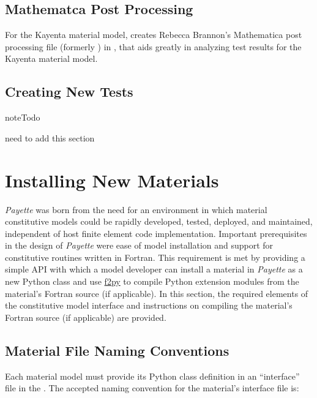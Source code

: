 \documentclass[letterpaper,10pt,english]{sphinxmanual}
\begin{document}
\section{Mathematca Post Processing}
\label{Files/test_payette:mathematca-post-processing}
For the Kayenta material model,  creates Rebecca Brannon's
Mathematica post processing file  (formerly )
in , that aids greatly in
analyzing test results for the Kayenta material model.


\section{Creating New Tests}
\label{Files/test_payette:creating-new-tests}
\begin{notice}{note}{Todo}

need to add this section
\end{notice}


\chapter{Installing New Materials}
\label{Files/installing_materials::doc}\label{Files/installing_materials:installing-new-materials}
\emph{Payette} was born from the need for an environment in which material
constitutive models could be rapidly developed, tested, deployed, and maintained,
independent of host finite element code implementation. Important prerequisites
in the design of \emph{Payette} were ease of model installation and support for
constitutive routines written in Fortran. This requirement is met by providing a
simple API with which a model developer can install a material in \emph{Payette} as
a new Python class and use \href{http://www.scipy.org/F2py}{f2py} to compile
Python extension modules from the material's Fortran source (if applicable). In
this section, the required elements of the constitutive model interface and
instructions on compiling the material's Fortran source (if applicable) are
provided.


\section{Material File Naming Conventions}
\label{Files/installing_materials:material-file-naming-conventions}
Each material model must provide its Python class definition in an ``interface''
file in the . The accepted naming convention
for the material's interface file is:
\end{document}
